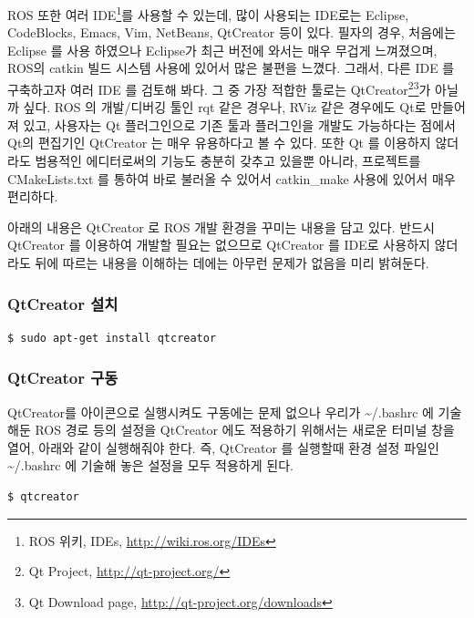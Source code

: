 ROS 또한 여러 IDE\footnote{ROS 위키, IDEs, \url{http://wiki.ros.org/IDEs}}를 사용할 수 있는데, 많이 사용되는 IDE로는 Eclipse, CodeBlocks, Emacs, Vim, NetBeans, QtCreator 등이 있다. 필자의 경우, 처음에는 Eclipse 를 사용 하였으나 Eclipse가 최근 버전에 와서는 매우 무겁게 느껴졌으며, ROS의 catkin 빌드 시스템 사용에 있어서 많은 불편을 느꼈다. 그래서, 다른 IDE 를 구축하고자 여러 IDE 를 검토해 봐다. 그 중 가장 적합한 툴로는 QtCreator\footnote{Qt Project, \url{http://qt-project.org/}}\footnote{Qt Download page, \url{http://qt-project.org/downloads}}가 아닐까 싶다. ROS 의 개발/디버깅 툴인 rqt 같은 경우나, RViz 같은 경우에도 Qt로 만들어져 있고, 사용자는 Qt 플러그인으로 기존 툴과 플러그인을 개발도 가능하다는 점에서 Qt의 편집기인 QtCreator 는 매우 유용하다고 볼 수 있다. 또한 Qt 를 이용하지 않더라도 범용적인 에디터로써의 기능도 충분히 갖추고 있을뿐 아니라, 프로젝트를 CMakeLists.txt 를 통하여 바로 불러올 수 있어서 catkin\_make 사용에 있어서 매우 편리하다.

아래의 내용은 QtCreator 로 ROS 개발 환경을 꾸미는 내용을 담고 있다. 반드시 QtCreator 를 이용하여 개발할 필요는 없으므로 QtCreator 를 IDE로 사용하지 않더라도 뒤에 따르는 내용을 이해하는 데에는 아무런 문제가 없음을 미리 밝혀둔다.

\subsubsection{QtCreator 설치}

\vspace{\baselineskip}
\begin{lstlisting}[language=ROS]
$ sudo apt-get install qtcreator
\end{lstlisting}

\subsubsection{QtCreator 구동}
QtCreator를 아이콘으로 실행시켜도 구동에는 문제 없으나 우리가 \textasciitilde/.bashrc 에 기술해둔 ROS 경로 등의 설정을 QtCreator 에도 적용하기 위해서는 새로운 터미널 창을 열어, 아래와 같이 실행해줘야 한다. 즉, QtCreator 를 실행할때 환경 설정 파일인 \textasciitilde/.bashrc 에 기술해 놓은 설정을 모두 적용하게 된다.\\

\begin{lstlisting}[language=ROS]
$ qtcreator
\end{lstlisting}


